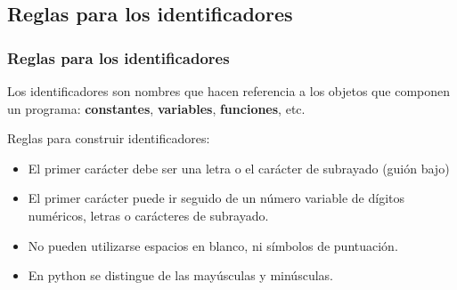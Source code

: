 {\subsection{Reglas para los identificadores}
\begin{frame}
\frametitle{Reglas para los identificadores}
Los identificadores son nombres que hacen referencia a los objetos que componen un programa: \textbf{constantes}, \textbf{variables}, \textbf{funciones}, etc.
\end{frame}
\begin{frame}
Reglas para construir identificadores:
\begin{itemize}[<+->]
\item El primer carácter debe ser una letra o el carácter de subrayado (guión bajo)
\item El primer carácter puede ir seguido de un número variable de dígitos numéricos, letras o carácteres de subrayado.
\item No pueden utilizarse espacios en blanco, ni símbolos de puntuación.
\item En python se distingue de las mayúsculas y minúsculas.
\end{itemize}
\end{frame}
}
